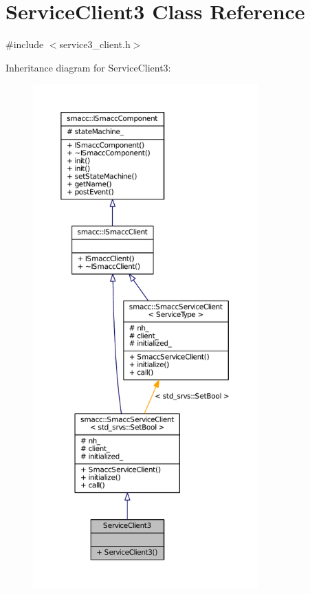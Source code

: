 \hypertarget{classServiceClient3}{}\section{Service\+Client3 Class Reference}
\label{classServiceClient3}


{\ttfamily \#include $<$service3\+\_\+client.\+h$>$}



Inheritance diagram for Service\+Client3\+:
\nopagebreak
\begin{figure}[H]
\begin{center}
\leavevmode
\includegraphics[height=550pt]{classServiceClient3__inherit__graph}
\end{center}
\end{figure}


